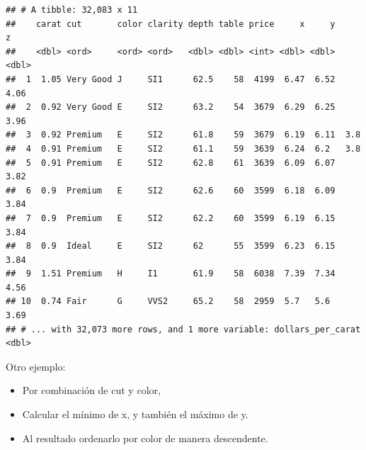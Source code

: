 \documentclass[]{book}
\newenvironment{Shaded}{\begin{snugshade}}{\end{snugshade}}
\newcommand{\KeywordTok}[1]{\textcolor[rgb]{0.13,0.29,0.53}{\textbf{#1}}}
\newcommand{\DataTypeTok}[1]{\textcolor[rgb]{0.13,0.29,0.53}{#1}}
\newcommand{\DecValTok}[1]{\textcolor[rgb]{0.00,0.00,0.81}{#1}}
\newcommand{\StringTok}[1]{\textcolor[rgb]{0.31,0.60,0.02}{#1}}
\newcommand{\CommentTok}[1]{\textcolor[rgb]{0.56,0.35,0.01}{\textit{#1}}}
\newcommand{\OperatorTok}[1]{\textcolor[rgb]{0.81,0.36,0.00}{\textbf{#1}}}
\newcommand{\NormalTok}[1]{#1}
\providecommand{\tightlist}{%
  \setlength{\itemsep}{0pt}\setlength{\parskip}{0pt}}
\theoremstyle{definition}
\theoremstyle{definition}
\theoremstyle{definition}
\theoremstyle{remark}
\begin{document}
\begin{verbatim}
## # A tibble: 32,083 x 11
##    carat cut       color clarity depth table price     x     y     z
##    <dbl> <ord>     <ord> <ord>   <dbl> <dbl> <int> <dbl> <dbl> <dbl>
##  1  1.05 Very Good J     SI1      62.5    58  4199  6.47  6.52  4.06
##  2  0.92 Very Good E     SI2      63.2    54  3679  6.29  6.25  3.96
##  3  0.92 Premium   E     SI2      61.8    59  3679  6.19  6.11  3.8 
##  4  0.91 Premium   E     SI2      61.1    59  3639  6.24  6.2   3.8 
##  5  0.91 Premium   E     SI2      62.8    61  3639  6.09  6.07  3.82
##  6  0.9  Premium   E     SI2      62.6    60  3599  6.18  6.09  3.84
##  7  0.9  Premium   E     SI2      62.2    60  3599  6.19  6.15  3.84
##  8  0.9  Ideal     E     SI2      62      55  3599  6.23  6.15  3.84
##  9  1.51 Premium   H     I1       61.9    58  6038  7.39  7.34  4.56
## 10  0.74 Fair      G     VVS2     65.2    58  2959  5.7   5.6   3.69
## # ... with 32,073 more rows, and 1 more variable: dollars_per_carat <dbl>
\end{verbatim}

Otro ejemplo:

\begin{itemize}
\tightlist
\item
  Por combinación de cut y color,
\item
  Calcular el mínimo de x, y también el máximo de y.
\item
  Al resultado ordenarlo por color de manera descendente.
\end{itemize}

\begin{Shaded}
\end{Shaded}
\end{document}

